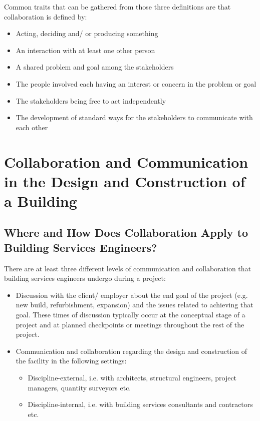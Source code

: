 Common traits that can be gathered from those three definitions are that collaboration is defined by:
\begin{itemize}
	\item Acting, deciding and/ or producing something %
	\item An interaction with at least one other person %
	\item A shared problem and goal among the stakeholders %
	\item The people involved each having an interest or concern in the problem or goal %
	\item The stakeholders being free to act independently
	\item The development of standard ways for the stakeholders to communicate with each other %
\end{itemize}




\section{Collaboration and Communication in the Design and Construction of a Building}



\subsection{Where and How Does Collaboration Apply to Building Services Engineers?}

There are at least three different levels of communication and collaboration that building services engineers undergo during a project:
\begin{itemize}
	\item Discussion with the client/ employer about the end goal of the project (e.g. new build, refurbishment, expansion) and the issues related to achieving that goal.
	These times of discussion typically occur at the conceptual stage of a project and at planned checkpoints or meetings throughout the rest of the project.
	\item Communication and collaboration regarding the design and construction of the facility in the following settings:
	\begin{itemize}
		\item Discipline-external, i.e. with architects, structural engineers, project managers, quantity surveyors etc.
		\item Discipline-internal, i.e. with building services consultants and contractors etc.
	\end{itemize}
\end{itemize}


